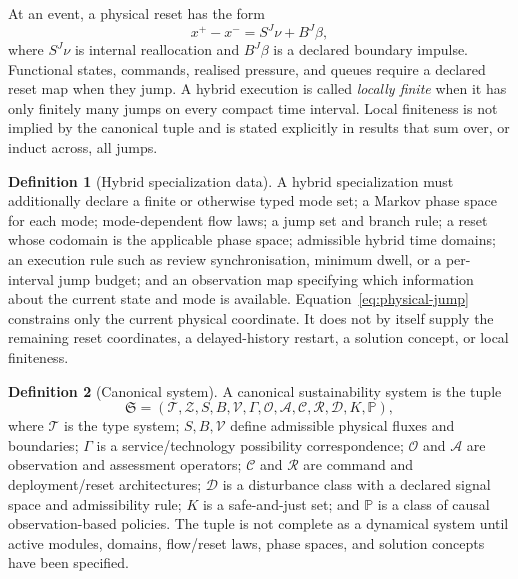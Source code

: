\documentclass[11pt]{article}
\theoremstyle{definition}
\newtheorem{definition}{Definition}
\begin{document}
At an event, a physical reset has the form
\begin{equation}
x^+-x^-=S^J\nu+B^J\beta,
\label{eq:physical-jump}
\end{equation}
where $S^J\nu$ is internal reallocation and $B^J\beta$ is a declared boundary impulse. Functional states, commands, realised pressure, and queues require a declared reset map when they jump. A hybrid execution is called \emph{locally finite} when it has only finitely many jumps on every compact time interval. Local finiteness is not implied by the canonical tuple and is stated explicitly in results that sum over, or induct across, all jumps.

\begin{definition}[Hybrid specialization data]
A hybrid specialization must additionally declare a finite or otherwise typed mode set; a Markov phase space for each mode; mode-dependent flow laws; a jump set and branch rule; a reset whose codomain is the applicable phase space; admissible hybrid time domains; an execution rule such as review synchronisation, minimum dwell, or a per-interval jump budget; and an observation map specifying which information about the current state and mode is available.  Equation~\eqref{eq:physical-jump} constrains only the current physical coordinate.  It does not by itself supply the remaining reset coordinates, a delayed-history restart, a solution concept, or local finiteness.
\end{definition}

\begin{definition}[Canonical system]
A canonical sustainability system is the tuple
\begin{equation}
\mathfrak S=
(\mathcal T,\mathcal Z,S,B,\mathcal V,\Gamma,
\mathcal O,\mathcal A,\mathcal C,\mathcal R,
\mathcal D,K,\mathbb P),
\label{eq:canonical-tuple}
\end{equation}
where $\mathcal T$ is the type system; $S,B,\mathcal V$ define admissible physical fluxes and boundaries; $\Gamma$ is a service/technology possibility correspondence; $\mathcal O$ and $\mathcal A$ are observation and assessment operators; $\mathcal C$ and $\mathcal R$ are command and deployment/reset architectures; $\mathcal D$ is a disturbance class with a declared signal space and admissibility rule; $K$ is a safe-and-just set; and $\mathbb P$ is a class of causal observation-based policies. The tuple is not complete as a dynamical system until active modules, domains, flow/reset laws, phase spaces, and solution concepts have been specified.
\end{definition}
\end{document}
